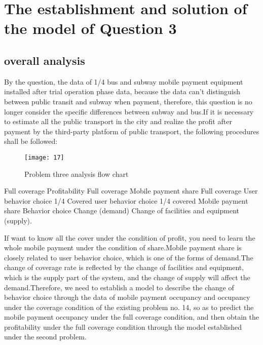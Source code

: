 \documentclass[../mcmpaper]{subfiles}
\begin{document}
\section{The establishment and solution of the model of Question 3}
\subsection{overall analysis}
By the question, the data of 1/4 bus and subway mobile payment equipment installed after trial operation phase data, because the data can't distinguish between public transit and subway when payment, therefore, this question is no longer consider the specific differences between subway and bus.If it is necessary to estimate all the public transport in the city and realize the profit after payment by the third-party platform of public transport, the following procedures shall be followed:
\begin{figure}[!ht]
\centering
\texttt{[image: 17]}
\caption{Problem three analysis flow chart}
\end{figure}
Full coverage Profitability  Full coverage Mobile payment share  Full coverage User behavior choice  1/4 Covered user behavior choice  1/4 covered Mobile payment share Behavior choice Change (demand)  Change of facilities and equipment (supply).
\par
If want to know all the cover under the condition of profit, you need to learn the whole mobile payment under the condition of share.Mobile payment share is closely related to user behavior choice, which is one of the forms of demand.The change of coverage rate is reflected by the change of facilities and equipment, which is the supply part of the system, and the change of supply will affect the demand.Therefore, we need to establish a model to describe the change of behavior choice through the data of mobile payment occupancy and occupancy under the coverage condition of the existing problem no. 14, so as to predict the mobile payment occupancy under the full coverage condition, and then obtain the profitability under the full coverage condition through the model established under the second problem.
\end{document}
